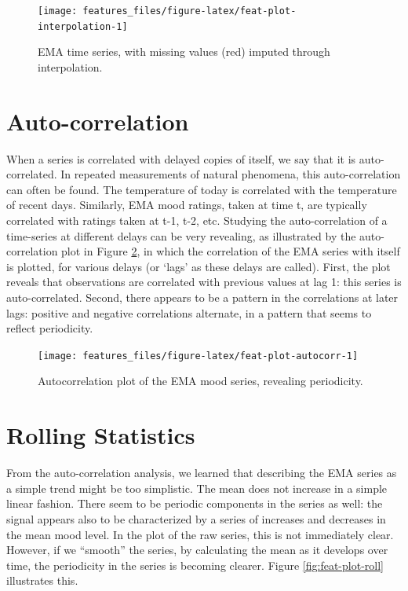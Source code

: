 \documentclass[]{book}
\begin{document}
\begin{figure}

{\centering \texttt{[image: features\_files/figure-latex/feat-plot-interpolation-1]} 

}

\caption{EMA time series, with missing values (red) imputed through interpolation.}\label{fig:feat-plot-interpolation}
\end{figure}

\section{Auto-correlation}\label{auto-correlation}


When a series is correlated with delayed copies of itself, we say that
it is auto-correlated. In repeated measurements of natural phenomena,
this auto-correlation can often be found. The temperature of today is
correlated with the temperature of recent days. Similarly, EMA mood
ratings, taken at time t, are typically correlated with ratings taken at
t-1, t-2, etc. Studying the auto-correlation of a time-series at
different delays can be very revealing, as illustrated by the
auto-correlation plot in Figure \ref{fig:feat-plot-autocorr}, in which
the correlation of the EMA series with itself is plotted, for various
delays (or `lags' as these delays are called). First, the plot reveals
that observations are correlated with previous values at lag 1: this
series is auto-correlated. Second, there appears to be a pattern in the
correlations at later lags: positive and negative correlations
alternate, in a pattern that seems to reflect periodicity.

\begin{figure}

{\centering \texttt{[image: features\_files/figure-latex/feat-plot-autocorr-1]} 

}

\caption{Autocorrelation plot of the EMA mood series, revealing periodicity.}\label{fig:feat-plot-autocorr}
\end{figure}

\section{Rolling Statistics}\label{rolling-statistics}

From the auto-correlation analysis, we learned that describing the EMA
series as a simple trend might be too simplistic. The mean does not
increase in a simple linear fashion. There seem to be periodic
components in the series as well: the signal appears also to be
characterized by a series of increases and decreases in the mean mood
level. In the plot of the raw series, this is not immediately clear.
However, if we ``smooth'' the series, by calculating the mean as it
develops over time, the periodicity in the series is becoming clearer.
Figure \ref{fig:feat-plot-roll} illustrates this.
\end{document}
